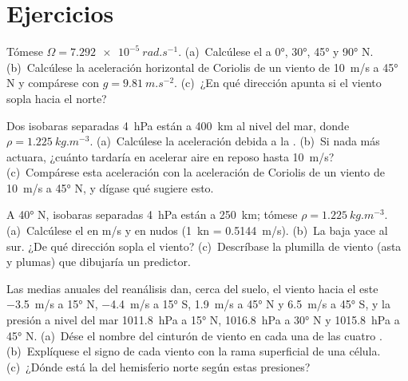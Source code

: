 \section{Ejercicios}

\begin{exercise}[$\star$]\label{exo:b1:atmospheric-circulation:1}
Tómese $\Omega = \qty{7.292e-5}{rad.s^{-1}}$. (a)~Calcúlese el  a
\ang{0}, \ang{30}, \ang{45} y \ang{90} N. (b)~Calcúlese la aceleración horizontal de Coriolis de un viento de \qty{10}{m/s} a \ang{45} N y compárese con $g =
\qty{9.81}{m.s^{-2}}$. (c)~¿En qué dirección apunta si el viento sopla hacia el norte?
\end{exercise}

\begin{exercise}[$\star$]\label{exo:b1:atmospheric-circulation:2}
Dos isobaras separadas \qty{4}{hPa} están a \qty{400}{km} al nivel del mar, donde $\rho =
\qty{1.225}{kg.m^{-3}}$. (a)~Calcúlese la aceleración debida a la . (b)~Si nada más actuara, ¿cuánto tardaría en acelerar aire en reposo hasta \qty{10}{m/s}? (c)~Compárese esta aceleración con la aceleración de Coriolis de un viento de \qty{10}{m/s} a \ang{45} N, y dígase qué sugiere esto.
\end{exercise}

\begin{exercise}[$\star$]\label{exo:b1:atmospheric-circulation:3}
A \ang{40} N, isobaras separadas \qty{4}{hPa} están a \qty{250}{km}; tómese $\rho =
\qty{1.225}{kg.m^{-3}}$. (a)~Calcúlese el  en \unit{m/s} y en nudos
(\qty{1}{kn} = \qty{0.5144}{m/s}). (b)~La baja yace al sur. ¿De qué dirección sopla el viento? (c)~Descríbase la plumilla de viento (asta y plumas) que dibujaría un predictor.
\end{exercise}

\begin{exercise}[$\star$]\label{exo:b1:atmospheric-circulation:4}
Las medias anuales del reanálisis dan, cerca del suelo, el viento hacia el este \qty{-3.5}{m/s} a \ang{15} N, \qty{-4.4}{m/s} a \ang{15} S, \qty{+1.9}{m/s} a
\ang{45} N y \qty{+6.5}{m/s} a \ang{45} S, y la presión a nivel del mar \qty{1011.8}{hPa} a \ang{15} N, \qty{1016.8}{hPa} a \ang{30} N y
\qty{1015.8}{hPa} a \ang{45} N. (a)~Dése el nombre del cinturón de viento en cada una de las cuatro . (b)~Explíquese el signo de cada viento con la rama superficial de una célula. (c)~¿Dónde está la  del hemisferio norte según estas presiones?
\end{exercise}

